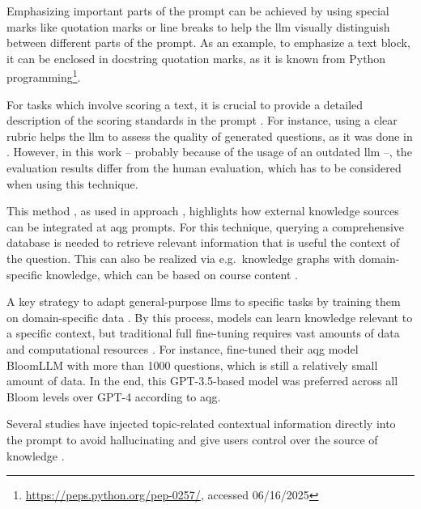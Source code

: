  Emphasizing important parts of the prompt can be achieved by using special marks like quotation marks or line breaks \cite{zhao_survey_2025} to help the \ac{llm} visually distinguish between different parts of the prompt. As an example, to emphasize a text block, it can be enclosed in docstring quotation marks, as it is known from Python programming\footnote{\url{https://peps.python.org/pep-0257/}, accessed 06/16/2025}.

 For tasks which involve scoring a text, it is crucial to provide a detailed description of the scoring standards in the prompt \cite{zhao_survey_2025}. For instance, using a clear rubric helps the \ac{llm} to assess the quality of generated questions, as it was done in \cite{scaria_automated_2024}. However, in this work -- probably because of the usage of an outdated \ac{llm} --, the evaluation results differ from the human evaluation, which has to be considered when using this technique.

 This method \cite{lewis_retrieval-augmented_2020}, as used in approach \cite{hang_mcqgen_2024}, highlights how external knowledge sources can be integrated at \ac{aqg} prompts. For this technique, querying a comprehensive database is needed to retrieve relevant information that is useful the context of the question. This can also be realized via e.g.\ knowledge graphs with domain-specific knowledge, which can be based on course content \cite{yang_heuristic_2024}.

 A key strategy to adapt general-purpose \acp{llm} to specific tasks by training them on domain-specific data \cite{hou_large_2024}. By this process, models can learn knowledge relevant to a specific context, but traditional full fine-tuning requires vast amounts of data and computational resources \cite{hou_large_2024}. For instance, \cite{duong-trung_bloomllm_2024} fine-tuned their \ac{aqg} model BloomLLM with more than 1000 questions, which is still a relatively small amount of data. In the end, this GPT-3.5-based model was preferred across all Bloom levels over GPT-4 according to \ac{aqg}.

 Several studies \cite{biancini_multiple-choice_2024,blobstein_angel_2023,bhowmick_automating_2023} have injected topic-related contextual information directly into the prompt to avoid hallucinating and give users control over the source of knowledge \cite{biancini_multiple-choice_2024}. 

